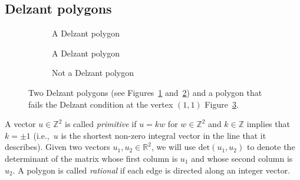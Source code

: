 \documentclass[pdftex]{sigma}
\numberwithin{equation}{section}
\def\Z{{\mathbb Z}}
\begin{document}
\subsection{Delzant polygons}
\label{sec:delzant-poly}


 \begin{figure}
 \centering
 \begin{subfigure}{.3\textwidth}
 \centering
 \caption{A Delzant polygon}
 \label{fig:delz1}
 \end{subfigure}
 \begin{subfigure}{.3\textwidth}
 \centering
 \caption{A Delzant polygon}
 \label{fig:delz2}
 \end{subfigure}
 \begin{subfigure}{.3\textwidth}
 \centering
 \caption{Not a Delzant polygon}
 \label{fig:not-delz}
 \end{subfigure}
 \caption{Two Delzant polygons (see Figures~\ref{fig:delz1} and~\ref{fig:delz2}) and a polygon that fails the Delzant condition at the vertex $(1,1)$ Figure~\ref{fig:not-delz}.}
 \label{fig:delz-poly-examples}
 \end{figure}

A vector $u\in\mathbb{Z}^2$ is called \emph{primitive} if $u = kw$ for $w\in\mathbb{Z}^2$ and $k\in\Z$ implies that $k=\pm 1$ (i.e.,~$u$ is the shortest non-zero integral vector in the line that it describes). Given two vectors $u_1,u_2\in\mathbb{R}^2$, we will use $\mathrm{det}(u_1,u_2)$ to denote the determinant of the matrix whose first column is $u_1$ and whose second column is $u_2$.
A polygon is called \emph{rational} if each edge is directed along an integer vector.
\end{document}
